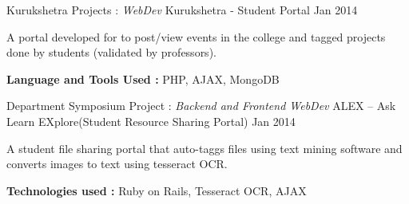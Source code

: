 \begin{cventries}
  \cventry
    {Kurukshetra Projects : \textit{WebDev}} %
    {Kurukshetra - Student Portal} %
    {} %
    {Jan 2014} %
    {
      \begin{cvitems}
      \item{A portal developed for to post/view events in the college and tagged projects done by students (validated by professors).}
      \item{\textbf{Language and Tools Used :} PHP, AJAX, MongoDB}
      \end{cvitems}
    }

  \cventry
    {Department Symposium Project : \textit{Backend and Frontend WebDev}} %
    {ALEX – Ask Learn EXplore(Student Resource Sharing Portal)} %
    {} %
    {Jan 2014} %
    {
      \begin{cvitems}
      \item{A student file sharing portal that auto-taggs files using text mining software and converts images to text using tesseract OCR.}
      \item{\textbf{Technologies used :} Ruby on Rails, Tesseract OCR, AJAX}
      \end{cvitems}
    }
\end{cventries}
